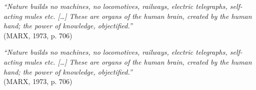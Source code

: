 


\begin{epigrafe}

\vspace*{\fill}\lang
{
    \begin{flushright}
        \textit{``Nature builds no machines, no locomotives, railways, electric
        telegraphs, self-acting mules etc. [\ldots{}] These are organs of the
        human brain, created by the human hand; the power of knowledge,
        objectified.''} \\ (MARX, 1973, p. 706)
    \end{flushright}
}
{
    \begin{flushright}
        \textit{``Nature builds no machines, no locomotives, railways, electric
        telegraphs, self-acting mules etc. [\ldots{}] These are organs of the
        human brain, created by the human hand; the power of knowledge,
        objectified.''} \\ (MARX, 1973, p. 706)
    \end{flushright}
}

\end{epigrafe}
